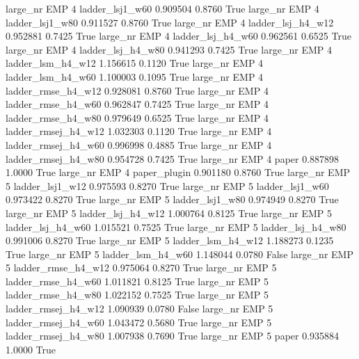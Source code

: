   large_nr      EMP                 4     ladder_lsj1_w60   0.909504      0.8760    True
  large_nr      EMP                 4     ladder_lsj1_w80   0.911527      0.8760    True
  large_nr      EMP                 4   ladder_lsj_h4_w12   0.952881      0.7425    True
  large_nr      EMP                 4   ladder_lsj_h4_w60   0.962561      0.6525    True
  large_nr      EMP                 4   ladder_lsj_h4_w80   0.941293      0.7425    True
  large_nr      EMP                 4   ladder_lsm_h4_w12   1.156615      0.1120    True
  large_nr      EMP                 4   ladder_lsm_h4_w60   1.100003      0.1095    True
  large_nr      EMP                 4  ladder_rmse_h4_w12   0.928081      0.8760    True
  large_nr      EMP                 4  ladder_rmse_h4_w60   0.962847      0.7425    True
  large_nr      EMP                 4  ladder_rmse_h4_w80   0.979649      0.6525    True
  large_nr      EMP                 4 ladder_rmsej_h4_w12   1.032303      0.1120    True
  large_nr      EMP                 4 ladder_rmsej_h4_w60   0.996998      0.4885    True
  large_nr      EMP                 4 ladder_rmsej_h4_w80   0.954728      0.7425    True
  large_nr      EMP                 4               paper   0.887898      1.0000    True
  large_nr      EMP                 4        paper_plugin   0.901180      0.8760    True
  large_nr      EMP                 5     ladder_lsj1_w12   0.975593      0.8270    True
  large_nr      EMP                 5     ladder_lsj1_w60   0.973422      0.8270    True
  large_nr      EMP                 5     ladder_lsj1_w80   0.974949      0.8270    True
  large_nr      EMP                 5   ladder_lsj_h4_w12   1.000764      0.8125    True
  large_nr      EMP                 5   ladder_lsj_h4_w60   1.015521      0.7525    True
  large_nr      EMP                 5   ladder_lsj_h4_w80   0.991006      0.8270    True
  large_nr      EMP                 5   ladder_lsm_h4_w12   1.188273      0.1235    True
  large_nr      EMP                 5   ladder_lsm_h4_w60   1.148044      0.0780   False
  large_nr      EMP                 5  ladder_rmse_h4_w12   0.975064      0.8270    True
  large_nr      EMP                 5  ladder_rmse_h4_w60   1.011821      0.8125    True
  large_nr      EMP                 5  ladder_rmse_h4_w80   1.022152      0.7525    True
  large_nr      EMP                 5 ladder_rmsej_h4_w12   1.090939      0.0780   False
  large_nr      EMP                 5 ladder_rmsej_h4_w60   1.043472      0.5680    True
  large_nr      EMP                 5 ladder_rmsej_h4_w80   1.007938      0.7690    True
  large_nr      EMP                 5               paper   0.935884      1.0000    True
